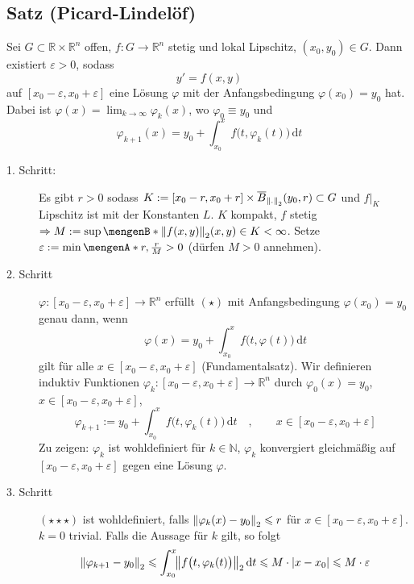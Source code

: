 \subsection[Satz von Picard-Lindelöf (Existenz einer Lösung)]{Satz (Picard-Lindelöf)} %
\label{sub:17}
Sei $G \subset \mathds{R} \times \mathds{R}^n$ offen, $f : G \to \mathds{R}^n$ stetig und lokal Lipschitz, $(x_0, y_0) \in G$. Dann existiert $\varepsilon >0$, sodass 
\[
	y' = f(x,y) \tag{$\star$}
\]
auf $[x_0 - \varepsilon, x_0 + \varepsilon]$ eine Lösung $\varphi$ mit der Anfangsbedingung $\varphi(x_0)= y_0$ hat. Dabei ist 
$\varphi(x)= \lim_{ k \to \infty} \varphi_k(x)$, wo $\varphi_0 \equiv y_0$ und
\[
	\varphi_{k+1} (x) = y_0 + \int_{x_0} ^{x} \! f\big(t, \varphi_k(t)\big)  \, \mathrm{d}t
\]
\begin{description}
	\item[1. Schritt:] Es gibt $r>0$ sodass $K:= [x_0 -r, x_0 +r] \times \overline{B}_{\norm[2]{.} }(y_0,r) \subset G$ und $f|_{K}$ Lipschitz ist mit der Konstanten $L$. 
	$K$ kompakt, $f$ stetig $\Rightarrow M := \sup \set[{\norm[2]{f(x,y)} }]{(x,y) \in K} < \infty $. Setze $\varepsilon := \min \set{r, \frac{r}{M} }>0 $ (dürfen $M>0$
	annehmen). 
	\item[2. Schritt] $\varphi : [x_0 -\varepsilon, x_0 + \varepsilon] \to \mathds{R}^n$ erfüllt $(\star)$ mit Anfangsbedingung $\varphi(x_0)=y_0$ genau dann, wenn 
	\[
		\varphi(x) = y_0 + \int_{x_0} ^{x} \! f\big(t, \varphi(t)\big)  \, \mathrm{d}t \tag{$\star\star$}
	\]
	gilt für alle $x \in  [x_0 - \varepsilon, x_0+ \varepsilon]$ (Fundamentalsatz). Wir definieren induktiv Funktionen 
	$\varphi_k : [x_0 - \varepsilon, x_0 + \varepsilon] \to \mathds{R}^n$ durch $\varphi_0 (x)= y_0$, $x \in [x_0 - \varepsilon, x_0 + \varepsilon]$,
	\[
		\varphi_{k+1} := y_0 + \int_{x_0} ^{x} \! f\big(t, \varphi_k(t)\big)  \, \mathrm{d}t \quad , \qquad x \in[x_0-\varepsilon, x_0 + \varepsilon]\tag{$\star\star\star$}
	\]
	Zu zeigen: $\varphi_k$ ist wohldefiniert für $k \in \mathds{N}$, $\varphi_k$ konvergiert gleichmäßig auf $[x_0 -\varepsilon, x_0 +\varepsilon]$ gegen eine Lösung 
	$\varphi$.
	\item[3. Schritt] $(\star\star\star)$ ist wohldefiniert, falls $\norm[2]{\varphi_k(x)-y_0} \le r $ für $x \in [x_0 -\varepsilon, x_0 +\varepsilon]$. $k=0$ trivial.
	Falls die Aussage für $k$ gilt, so folgt 
	\begin{align*}
		\norm[2]{\varphi_{k+1} -y_0} \le \int_{x_0} ^{x} \! \norm[2]{f\big(t, \varphi_k(t)\big)}  \, \mathrm{d}t \le   M \cdot \abs*{x-x_0} \le M \cdot \varepsilon

\end{align*}
\end{description}
